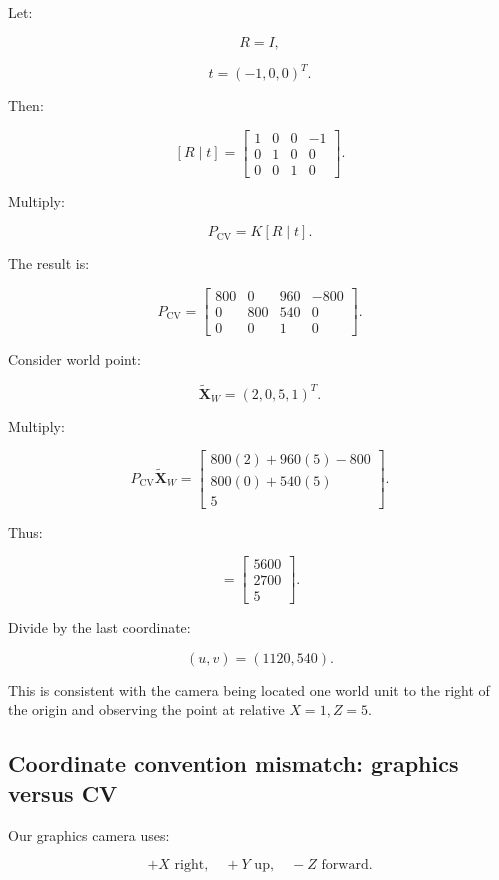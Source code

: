 Let:

\[
 R=I,
\]

\[
 t=(-1,0,0)^T.
\]

Then:

\[
 [R\mid t] = \begin{bmatrix} 1&0&0&-1\\ 0&1&0&0\\ 0&0&1&0 \end{bmatrix}.
\]

Multiply:

\[
 P_{\mathrm{CV}}= K[R\mid t].
\]

The result is:

\[
 \boxed{ P_{\mathrm{CV}}= \begin{bmatrix} 800&0&960&-800\\ 0&800&540&0\\ 0&0&1&0 \end{bmatrix} }.
\]

Consider world point:

\[
 \tilde{\mathbf X}_W=(2,0,5,1)^T.
\]

Multiply:

\[
 P_{\mathrm{CV}}\tilde{\mathbf X}_W = \begin{bmatrix} 800(2)+960(5)-800\\ 800(0)+540(5)\\ 5 \end{bmatrix}.
\]

Thus:

\[
 = \begin{bmatrix} 5600\\2700\\5 \end{bmatrix}.
\]

Divide by the last coordinate:

\[
 \boxed{ (u,v)=(1120,540) }.
\]

This is consistent with the camera being located one world unit to the right of the origin and observing the point at relative \(X=1,Z=5\).

\subsection{Coordinate convention mismatch: graphics versus CV}\label{02-foundations-ii-ch035-coordinate-convention-mismatch-graphics-versus-cv}

Our graphics camera uses:

\[
 +X\text{ right},\quad+Y\text{ up},\quad-Z\text{ forward}.
\]

